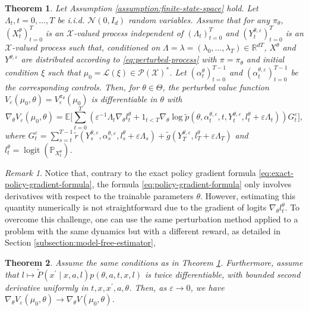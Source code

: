 \documentclass[11pt]{article}
\numberwithin{equation}{section}
\newtheorem{theorem}{Theorem}[section]
\theoremstyle{definition}
\theoremstyle{remark}
\newtheorem{remark}{Remark}[section]
\def\eps{\varepsilon}
\def\cX{\mathcal{X}}
\def\R{{\mathbb R}}
\DeclareMathOperator*{\logit}{logit}
\begin{document}
\begin{theorem}
    \label{theorem:perturbed-gradient}
    Let Assumption \ref{assumption:finite-state-space} hold.
    Let $\Lambda_t,t = 0, \ldots, T$ be i.i.d. $\mathcal N (0, I_d)$ random variables. 
    Assume that for any $\pi_\theta$, $(X_t^\theta)_{t = 0}^T$ is an $\cX$-valued process independent of $(\Lambda_t)_{t=0}^{T}$ and
    $(Y_t^{\theta, \eps})_{t=0}^T$ is an $\cX$-valued process such that, conditioned on $\Lambda = \lambda = (\lambda_0, \ldots, \lambda_{T}) \in \R^{dT}$,
    $X^\theta$ and $Y^{\theta, \eps}$ are distributed according to \eqref{eq:perturbed-process} with $\pi = \pi_\theta$ 
    and initial condition $\xi$ such that $\mu_0 = \mathcal L (\xi) \in \mathcal P (\cX)^*$.
    Let $(\alpha_t^\theta)_{t=0}^{T-1}$ and $(\alpha_t^{\theta, \eps})_{t=0}^{T-1}$ be the corresponding controls.
    Then, for $\theta \in \Theta$, the perturbed value function $V_\eps (\mu_0, \theta) = V_\eps^{\pi_\theta}(\mu_0)$ is differentiable in $\theta$ with 
    \begin{equation}
        \label{eq:policy-gradient-formula}
\nabla_{\theta} V_\eps(\mu_0, \theta) = \mathbb E \Bigg[ \sum_{t = 0}^{T} \left(\eps^{-1} \Lambda_t \nabla_{\theta} l_t^\theta +  1_{t < T} \nabla_\theta \log \tilde p(\theta, \alpha_t^{\theta,\eps}, t,Y_t^{\theta,\eps}, l_t^\theta + \eps \Lambda_t) \right)G_t^\eps\Bigg],
    \end{equation}
    where $G_t^\eps = \sum_{s=t}^{T-1} \tilde r(Y^{\theta,\eps}_s, \alpha_s^{\theta,\eps}, l_s^\theta + \eps \Lambda_s) + \tilde g(Y_T^{\theta, \eps}, l_T^\theta + \eps \Lambda_T)$ and $l_t^\theta = \logit (\mathbb P_{X_t^\theta})$.
\end{theorem}

\begin{remark}
    Notice that, contrary to the exact policy gradient formula \eqref{eq:exact-policy-gradient-formula}, the formula \eqref{eq:policy-gradient-formula} only involves derivatives with respect to the trainable parameters $\theta$. However, estimating this quantity numerically is not straightforward due to the gradient of logits $\nabla_\theta l_t^\theta$. To overcome this challenge, one can use the same perturbation method applied to a problem with the same dynamics but with a different reward, as detailed in Section \ref{subsection:model-free-estimator}, 
\end{remark}

\begin{theorem}
    \label{theorem:convergence-perturbed-gradient}
    Assume the same conditions as in Theorem \ref{theorem:perturbed-gradient}. Furthermore, assume that $l \mapsto \tilde P (x^\prime \mid x, a, l) p(\theta, a, t,x, l)$ is twice differentiable, with bounded second derivative uniformly in $t,x, x^\prime, a, \theta$.
    Then, as $\eps \to 0$, we have $\nabla_\theta V_\eps(\mu_0, \theta) \to \nabla_\theta V(\mu_0, \theta)$.
\end{theorem}
\end{document}
